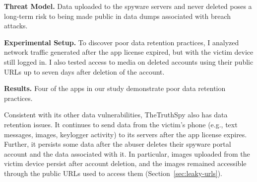 \textbf{Threat Model.} Data uploaded to the spyware servers and never deleted poses a long-term risk to being made public in data dumps associated with breach attacks.

\textbf{Experimental Setup.}  To discover poor data retention practices, I analyzed network traffic generated after the app license expired, but with the victim device still logged in.  I also tested
access to media on deleted accounts using their public URLs up to
seven days after deletion of the account.


\textbf{Results.}  Four of the apps in our study demonstrate poor data retention practices.

Consistent with its other data vulnerabilities,
TheTruthSpy also has data retention issues.
It continues to send
data from the victim's phone (e.g., text messages, images, keylogger
activity) to its servers after the app license expires. Further, it persists some data after the abuser
deletes their spyware portal account and the data associated with it.
%
%
In particular, images uploaded from the victim device persist after
account deletion, and the images remained accessible through the
public URLs used to access them (Section~\ref{sec:leaky-urls}).


